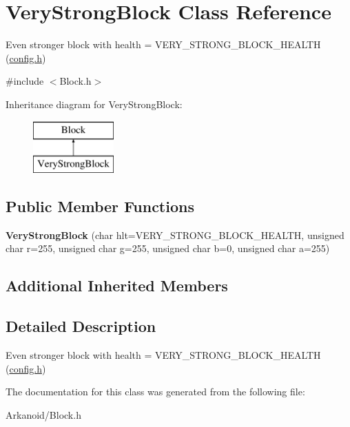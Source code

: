 \hypertarget{class_very_strong_block}{}\section{Very\+Strong\+Block Class Reference}
\label{class_very_strong_block}


Even stronger block with health = V\+E\+R\+Y\+\_\+\+S\+T\+R\+O\+N\+G\+\_\+\+B\+L\+O\+C\+K\+\_\+\+H\+E\+A\+L\+TH (\hyperlink{_config_8h_source}{config.\+h})  




{\ttfamily \#include $<$Block.\+h$>$}

Inheritance diagram for Very\+Strong\+Block\+:\begin{figure}[H]
\begin{center}
\leavevmode
\includegraphics[height=2.000000cm]{class_very_strong_block}
\end{center}
\end{figure}
\subsection*{Public Member Functions}
\begin{DoxyCompactItemize}
\item 
\mbox{\label{class_very_strong_block_a0566c718401694910412ef5b101d638e}} 
{\bfseries Very\+Strong\+Block} (char hlt=V\+E\+R\+Y\+\_\+\+S\+T\+R\+O\+N\+G\+\_\+\+B\+L\+O\+C\+K\+\_\+\+H\+E\+A\+L\+TH, unsigned char r=255, unsigned char g=255, unsigned char b=0, unsigned char a=255)
\end{DoxyCompactItemize}
\subsection*{Additional Inherited Members}


\subsection{Detailed Description}
Even stronger block with health = V\+E\+R\+Y\+\_\+\+S\+T\+R\+O\+N\+G\+\_\+\+B\+L\+O\+C\+K\+\_\+\+H\+E\+A\+L\+TH (\hyperlink{_config_8h_source}{config.\+h}) 

The documentation for this class was generated from the following file\+:\begin{DoxyCompactItemize}
\item 
Arkanoid/Block.\+h\end{DoxyCompactItemize}
